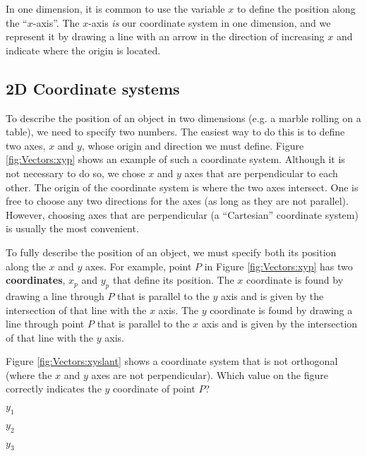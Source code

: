In one dimension, it is common to use the variable $x$ to define the position along the ``$x$-axis''. The $x$-axis \textit{is} our coordinate system in one dimension, and we represent it by drawing a line with an arrow in the direction of increasing $x$ and indicate where the origin is located.

 
\subsection{2D Coordinate systems}
To describe the position of an object in two dimensions (e.g. a marble rolling on a table), we need to specify two numbers. The easiest way to do this is to define two axes, $x$ and $y$, whose origin and direction we must define. Figure \ref{fig:Vectors:xyp} shows an example of such a coordinate system. Although it is not necessary to do so, we chose $x$ and $y$ axes that are perpendicular to each other. The origin of the coordinate system is where the two axes intersect. One is free to choose any two directions for the axes (as long as they are not parallel). However, choosing axes that are perpendicular (a ``Cartesian'' coordinate system) is usually the most convenient.

To fully describe the position of an object, we must specify both its position along the $x$ and $y$ axes. For example, point $P$ in Figure \ref{fig:Vectors:xyp} has two \textbf{coordinates}, $x_p$ and $y_p$ that define its position. The $x$ coordinate is found by drawing a line through $P$ that is parallel to the $y$ axis and is given by the intersection of that line with the $x$ axis. The $y$ coordinate is found by drawing a line through point $P$ that is parallel to the $x$ axis and is given by the intersection of that line with the $y$ axis.


\begin{checkpoint}
\begin{MCquestion}{Figure \ref{fig:Vectors:xyslant} shows a coordinate system that is not orthogonal (where the $x$ and $y$ axes are not perpendicular). Which value on the figure correctly indicates the $y$ coordinate of point $P$?
}
\item $y_1$ \correct
\item $y_2$
\item $y_3$
\end{MCquestion}
\end{checkpoint}

